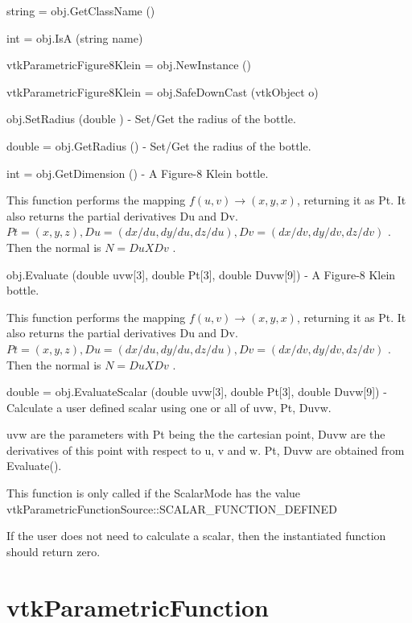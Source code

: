 \begin{DoxyItemize}
\item {\ttfamily string = obj.\-Get\-Class\-Name ()}  
\item {\ttfamily int = obj.\-Is\-A (string name)}  
\item {\ttfamily vtk\-Parametric\-Figure8\-Klein = obj.\-New\-Instance ()}  
\item {\ttfamily vtk\-Parametric\-Figure8\-Klein = obj.\-Safe\-Down\-Cast (vtk\-Object o)}  
\item {\ttfamily obj.\-Set\-Radius (double )} -\/ Set/\-Get the radius of the bottle.  
\item {\ttfamily double = obj.\-Get\-Radius ()} -\/ Set/\-Get the radius of the bottle.  
\item {\ttfamily int = obj.\-Get\-Dimension ()} -\/ A Figure-\/8 Klein bottle.

This function performs the mapping $f(u,v) \rightarrow (x,y,x)$, returning it as Pt. It also returns the partial derivatives Du and Dv. $Pt = (x, y, z), Du = (dx/du, dy/du, dz/du), Dv = (dx/dv, dy/dv, dz/dv)$ . Then the normal is $N = Du X Dv$ .  
\item {\ttfamily obj.\-Evaluate (double uvw\mbox{[}3\mbox{]}, double Pt\mbox{[}3\mbox{]}, double Duvw\mbox{[}9\mbox{]})} -\/ A Figure-\/8 Klein bottle.

This function performs the mapping $f(u,v) \rightarrow (x,y,x)$, returning it as Pt. It also returns the partial derivatives Du and Dv. $Pt = (x, y, z), Du = (dx/du, dy/du, dz/du), Dv = (dx/dv, dy/dv, dz/dv)$ . Then the normal is $N = Du X Dv$ .  
\item {\ttfamily double = obj.\-Evaluate\-Scalar (double uvw\mbox{[}3\mbox{]}, double Pt\mbox{[}3\mbox{]}, double Duvw\mbox{[}9\mbox{]})} -\/ Calculate a user defined scalar using one or all of uvw, Pt, Duvw.

uvw are the parameters with Pt being the the cartesian point, Duvw are the derivatives of this point with respect to u, v and w. Pt, Duvw are obtained from Evaluate().

This function is only called if the Scalar\-Mode has the value vtk\-Parametric\-Function\-Source\-::\-S\-C\-A\-L\-A\-R\-\_\-\-F\-U\-N\-C\-T\-I\-O\-N\-\_\-\-D\-E\-F\-I\-N\-E\-D

If the user does not need to calculate a scalar, then the instantiated function should return zero.


\end{DoxyItemize}\hypertarget{vtkcommon_vtkparametricfunction}{}\section{vtk\-Parametric\-Function}\label{vtkcommon_vtkparametricfunction}
